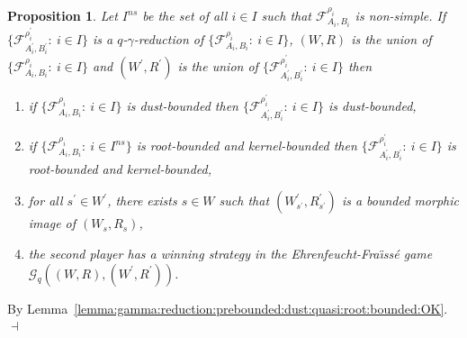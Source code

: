 \documentclass[draft]{article}
\newtheorem{proposition}{Proposition}
\newenvironment{proof}{{\bf Proof:}}{~$\dashv$\\}
\begin{document}
\begin{proposition}\label{lemma:good:properties:of:gamma:reductions:indexed}
%
%
Let $I^{ns}$ be the set of all $i{\in}I$ such that ${\mathcal F}_{A_{i},B_{i}}^{\rho_{i}}$ is non-simple.
If $\{{\mathcal F}_{A_{i}^{\prime},B_{i}^{\prime}}^{\rho_{i}^{\prime}}:\ i{\in}I\}$ is a $q$-$\gamma$-reduction of $\{{\mathcal F}_{A_{i},B_{i}}^{\rho_{i}}:\ i{\in}I\}$, $(W,R)$ is the union of $\{{\mathcal F}_{A_{i},B_{i}}^{\rho_{i}}:\ i{\in}I\}$ and $(W^{\prime},R^{\prime})$ is the union of $\{{\mathcal F}_{A_{i}^{\prime},B_{i}^{\prime}}^{\rho_{i}^{\prime}}:\ i{\in}I\}$ then
%
%
\begin{enumerate}
%
%
\item if $\{{\mathcal F}_{A_{i},B_{i}}^{\rho_{i}}:\ i{\in}I\}$ is dust-bounded then $\{{\mathcal F}_{A_{i}^{\prime},B_{i}^{\prime}}^{\rho_{i}^{\prime}}:\ i{\in}I\}$ is dust-bounded,
%
%
\item if $\{{\mathcal F}_{A_{i},B_{i}}^{\rho_{i}}:\ i{\in}I^{ns}\}$ is root-bounded and kernel-bounded then $\{{\mathcal F}_{A_{i}^{\prime},B_{i}^{\prime}}^{\rho_{i}^{\prime}}:\ i{\in}I\}$ is root-bounded and kernel-bounded,
%
%
\item for all $s^{\prime}{\in}W^{\prime}$, there exists $s{\in}W$ such that $(W^{\prime}_{s^{\prime}},R^{\prime}_{s^{\prime}})$ is a bounded morphic image of $(W_{s},R_{s})$,
%
%
\item the second player has a winning strategy in the Ehrenfeucht-Fra\"\i ss\'e game ${\mathcal G}_{q}((W,R),(W^{\prime},R^{\prime}))$.
%
%
\end{enumerate}
%
%
\end{proposition}
%
%
\begin{proof}
%
%
By Lemma~\ref{lemma:gamma:reduction:prebounded:dust:quasi:root:bounded:OK}.
%
%
\medskip
%
%
\end{proof}
%
%
%
%
\end{document}
